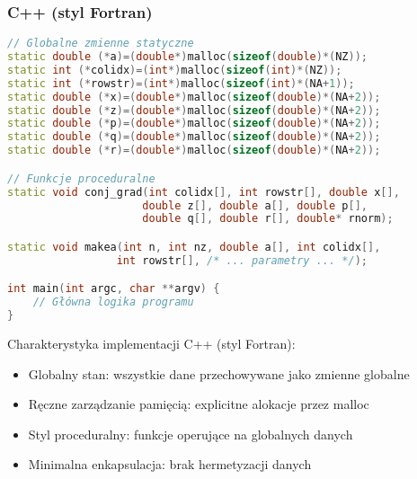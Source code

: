 \subsubsection{C++ (styl Fortran)}
\begin{lstlisting}[language=C++, caption={Struktura benchmarku CG w języku C++}, label={lst:cg_cpp_structure}]
// Globalne zmienne statyczne
static double (*a)=(double*)malloc(sizeof(double)*(NZ));
static int (*colidx)=(int*)malloc(sizeof(int)*(NZ));
static int (*rowstr)=(int*)malloc(sizeof(int)*(NA+1));
static double (*x)=(double*)malloc(sizeof(double)*(NA+2));
static double (*z)=(double*)malloc(sizeof(double)*(NA+2));
static double (*p)=(double*)malloc(sizeof(double)*(NA+2));
static double (*q)=(double*)malloc(sizeof(double)*(NA+2));
static double (*r)=(double*)malloc(sizeof(double)*(NA+2));

// Funkcje proceduralne
static void conj_grad(int colidx[], int rowstr[], double x[], 
                     double z[], double a[], double p[], 
                     double q[], double r[], double* rnorm);

static void makea(int n, int nz, double a[], int colidx[], 
                 int rowstr[], /* ... parametry ... */);

int main(int argc, char **argv) {
    // Główna logika programu
}
\end{lstlisting}
Charakterystyka implementacji C++ (styl Fortran):
\begin{itemize}
    \item Globalny stan: wszystkie dane przechowywane jako zmienne globalne
    \item Ręczne zarządzanie pamięcią: explicitne alokacje przez malloc
    \item Styl proceduralny: funkcje operujące na globalnych danych
    \item Minimalna enkapsulacja: brak hermetyzacji danych
\end{itemize}
